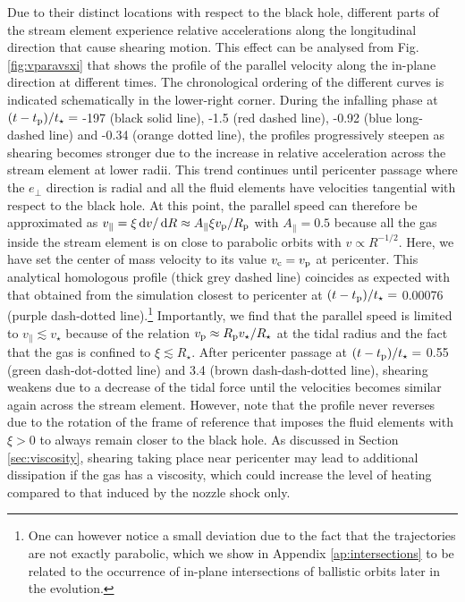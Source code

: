\documentclass[a4paper,fleqn,usenatbib]{mnras}
\newcommand*\diff{\mathop{}\!\mathrm{d}}
\newcommand{\rstar}{R_{\star}}
\newcommand{\tp}{t_{\rm p}}
\newcommand{\tstar}{t_{\star}}
\begin{document}
Due to their distinct locations with respect to the black hole, different parts of the stream element experience relative accelerations along the longitudinal direction that cause shearing motion. This effect can be analysed from Fig. \ref{fig:vparavsxi} that shows the profile of the parallel velocity along the in-plane direction at different times. The chronological ordering of the different curves is indicated schematically in the lower-right corner. During the infalling phase at $(t - \tp)/\tstar =$ -197 (black solid line), -1.5 (red dashed line), -0.92 (blue long-dashed line) and -0.34 (orange dotted line), the profiles progressively steepen as shearing becomes stronger due to the increase in relative acceleration across the stream element at lower radii. This trend continues until pericenter passage where the $e_{\perp}$ direction is radial and all the fluid elements have velocities tangential with respect to the black hole. At this point, the parallel speed can therefore be approximated as $v_{\parallel} = \xi \diff v / \diff R \approx A_{\parallel} \xi v_{\rm p} / R_{\rm p}$ with $A_{\parallel} =0.5$ because all the gas inside the stream element is on close to parabolic orbits with $v \propto R^{-1/2}$. Here, we have set the center of mass velocity to its value $v_{\rm c} = v_{\rm p}$ at pericenter. This analytical homologous profile (thick grey dashed line) coincides as expected with that obtained from the simulation closest to pericenter at $(t - \tp)/\tstar =$ 0.00076 (purple dash-dotted line).\footnote{One can however notice a small deviation due to the fact that the trajectories are not exactly parabolic, which we show in Appendix \ref{ap:intersections} to be related to the occurrence of in-plane intersections of ballistic orbits later in the evolution.} Importantly, we find that the parallel speed is limited to $v_{\parallel} \lesssim v_{\star}$ because of the relation $v_{\rm p} \approx R_{\rm p} v_{\star} / \rstar$ at the tidal radius and the fact that the gas is confined to $\xi \lesssim \rstar$. After pericenter passage at $(t - \tp)/\tstar =$ 0.55 (green dash-dot-dotted line) and 3.4 (brown dash-dash-dotted line), shearing weakens due to a decrease of the tidal force until the velocities becomes similar again across the stream element. However, note that the profile never reverses due to the rotation of the frame of reference that imposes the fluid elements with $\xi>0$ to always remain closer to the black hole. As discussed in Section \ref{sec:viscosity}, shearing taking place near pericenter may lead to additional dissipation if the gas has a viscosity, which could increase the level of heating compared to that induced by the nozzle shock only.
\end{document}
